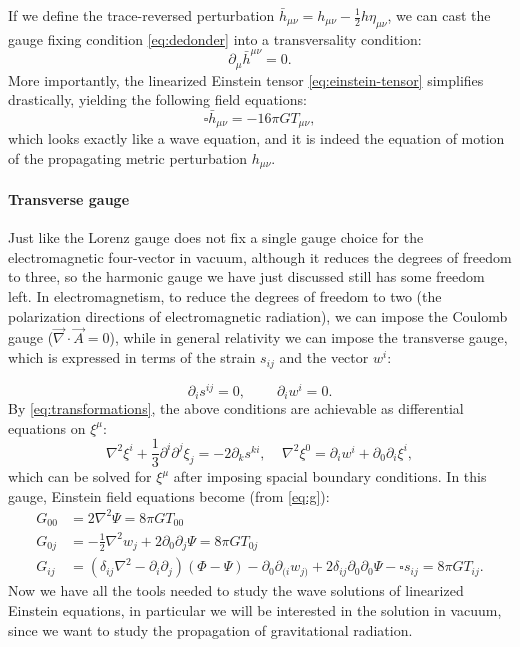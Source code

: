 \documentclass[a4paper]{article}
\begin{document}
If we define the trace-reversed perturbation $\bar{h}_{\mu\nu} = h_{\mu\nu} - \frac{1}{2}h \eta_{\mu\nu}$, we can cast the gauge fixing condition \eqref{eq:dedonder} into a transversality condition:
$$\partial_{\mu}\bar{h}^{\mu\nu} = 0.$$
More importantly, the linearized Einstein tensor \eqref{eq:einstein-tensor} simplifies drastically, yielding the following field equations:
$$\square\bar{h}_{\mu\nu} = -16 \pi G T_{\mu\nu},$$
which looks exactly like a wave equation, and it is indeed the equation of motion of the propagating metric perturbation $h_{\mu\nu}$.

\paragraph{Transverse gauge\\}
Just like the Lorenz gauge does not fix a single gauge choice for the electromagnetic four-vector in vacuum, although it reduces the degrees of freedom to three, so the harmonic gauge we have just discussed still has some freedom left. In electromagnetism, to reduce the degrees of freedom to two (the polarization directions of electromagnetic radiation), we can impose the Coulomb gauge ($\vec{\nabla}\cdot\vec{A} = 0$), while in general relativity we can impose the transverse gauge, which is expressed in terms of the strain $s_{ij}$ and the vector $w^i$:

\begin{equation}
  \partial_i s^{ij} = 0,\ \ \ \ \ \ \ \ \ \ \partial_i w^i = 0.
\end{equation}
By \eqref{eq:transformations}, the above conditions are achievable as differential equations on $\xi^{\mu}$:
$$\nabla^2 \xi^i + \frac{1}{3}\partial^i\partial^j \xi_j = -2 \partial_k s^{ki},\ \ \ \ \ \nabla^2 \xi^0 = \partial_i w^i + \partial_0\partial_i\xi^i,$$
which can be solved for $\xi^{\mu}$ after imposing spacial boundary conditions.
In this gauge, Einstein field equations become (from \eqref{eq:g}):
\begin{subequations}
  \begin{align}
    G_{00} &= 2 \nabla^2 \Psi = 8 \pi G T_{00}\label{eq:g00-t}\\
    G_{0j} &= -\frac{1}{2}\nabla^2 w_j + 2\partial_0\partial_j\Psi = 8\pi G T_{0j}\label{eq:g0j-t}\\
    G_{ij} &= (\delta_{ij}\nabla^2 - \partial_i\partial_j)(\Phi - \Psi) - \partial_0\partial_{(i}w_{j)} + 2\delta_{ij} \partial_0 \partial_0 \Psi - \square s_{ij} = 8 \pi G T_{ij}\label{eq:gij-t}.
  \end{align}
\end{subequations}
Now we have all the tools needed to study the wave solutions of linearized Einstein equations, in particular we will be interested in the solution in vacuum, since we want to study the propagation of gravitational radiation.
\end{document}
